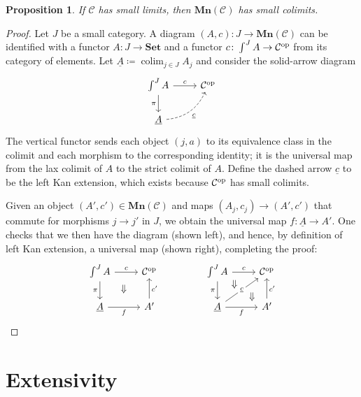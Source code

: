 \documentclass[11pt, one side, article]{memoir}
\theoremstyle{definition}
\theoremstyle{plain}
\newtheorem{proposition}[definitionx]{Proposition}
\DeclareMathOperator*{\colim}{colim}
\newcommand{\cat}[1]{\mathcal{#1}}%
\newcommand{\Cat}[1]{\mathbf{#1}}%
\newcommand{\op}{^\tn{op}}
\newcommand{\tn}[1]{\textnormal{#1}}
\newcommand{\ul}[1]{\underline{#1}}
\newcommand{\smset}{\Cat{Set}}
\newcommand{\0}{\textsf{0}}
\newcommand{\1}{\tn{\textsf{1}}}
\newcommand{\2}{\tn{\textsf{2}}}
\newcommand{\3}{\tn{\textsf{3}}}
\newcommand{\4}{\tn{\textsf{4}}}
\newcommand{\5}{\tn{\textsf{5}}}
\newcommand{\6}{\tn{\textsf{6}}}
\newcommand{\7}{\tn{\textsf{7}}}
\newcommand{\8}{\tn{\textsf{8}}}
\newcommand{\9}{\tn{\textsf{9}}}
\newcommand{\mn}{\Cat{Mn}}
\begin{document}
\begin{proposition}\label{prop.limits_to_colimits}
If $\cat{C}$ has small limits, then $\mn(\cat{C})$ has small colimits.
\end{proposition}
\begin{proof}
Let $J$ be a small category. A diagram $(A,c)\colon J\to \mn(\cat{C})$ can be identified with a functor $A\colon J\to \smset$ and a functor $c\colon \int^JA\to\cat{C}\op$ from its category of elements. Let $\ul{A}\coloneqq\colim_{j\in J}A_j$ and consider the solid-arrow diagram
\[
\begin{tikzcd}
	\int^JA\ar[r, "c"]\ar[d, "\pi"']&
	\cat{C}\op\\
	\ul{A}\ar[ur, bend right, dashed, "\ul{c}"']
\end{tikzcd}
\]
The vertical functor sends each object $(j,a)$ to its equivalence class in the colimit and each morphism to the corresponding identity; it is the universal map from the lax colimit of $A$ to the strict colimit of $A$. Define the dashed arrow $\ul{c}$ to be the left Kan extension, which exists because $\cat{C}\op$ has small colimits.

Given an object $(A',c')\in\mn(\cat{C})$ and maps $(A_j,c_j)\to(A',c')$ that commute for morphisms $j\to j'$ in $J$, we obtain the universal map $f\colon\ul{A}\to A'$. One checks that we then have the diagram (shown left), and hence, by definition of left Kan extension, a universal map (shown right), completing the proof:
\[
\begin{tikzcd}
	\int^JA\ar[r, "c"]\ar[d, "\pi"']&
	\cat{C}\op\\
	\ul{A}\ar[r, "f"']&A'\ar[u, "c'"']\ar[ul, phantom, pos=.6, "\Downarrow"]
\end{tikzcd}
\hspace{.6in}
\begin{tikzcd}
	\int^JA\ar[r, "c"]\ar[d, "\pi"']&
	\cat{C}\op\\
	\ul{A}\ar[r, "f"']\ar[ur, "\ul{c}" description]&A'\ar[u, "c'"']
	\ar[ul, phantom, pos=.2, "\Downarrow"]\ar[ul, phantom, pos=.85, "\Downarrow"]
\end{tikzcd}
\qedhere
\]
\end{proof}

\section{Extensivity}
\end{document}
